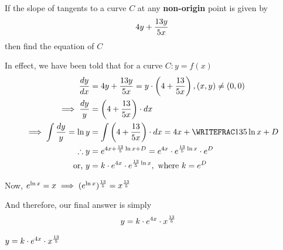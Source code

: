 

\question[3] If the slope of tangents to a curve $C$ at any \textbf{non-origin} point is given by 
\[4 y + \dfrac{13 y}{5 x} \]then find the equation of $C$

\watchout

\begin{solution}[\halfpage]
  In effect, we have been told that for a curve $C: y = f(x)$ 
  \begin{align}
    \dfrac{dy}{dx} &= \va y + \dfrac{\vb y}{\vc x} 
    = y\cdot\left(\va + \dfrac{\vb}{\vc x} \right), (x,y)\neq(0,0) \\
    \implies \dfrac{dy}{y} &= \left(\va + \dfrac{\vb}{\vc x}\right)\cdot dx \\
    \implies\int\dfrac{dy}{y} = \ln y &= \int \left(\va + \dfrac{\vb}{\vc x}\right)\cdot dx =  \va x + \WRITEFRAC\vb\vc\ln x + D \\
    \therefore y &= e^{\va x + \frac\vb\vc\ln x + D} = e^{\va x}\cdot e^{\frac\vb\vc\ln x}\cdot e^{D} \\
    \text{or, } y &= k\cdot e^{\va x}\cdot e^{\frac\vb\vc\ln x}, \text{ where } k = e^D
  \end{align}
  
  Now, $e^{\ln x} = x \implies (e^{\ln x})^{\frac{13}{5}} = x^{\frac{13}{5}}$
  
  And therefore, our final answer is simply
  \begin{align}
    y &= k\cdot e^{4 x}\cdot x^{\frac{13}{5}}
  \end{align}
\end{solution}

\ifprintanswers\begin{codex}
	$y = k\cdot e^{4 x}\cdot x^{\frac{13}{5}}$
\end{codex}\fi
